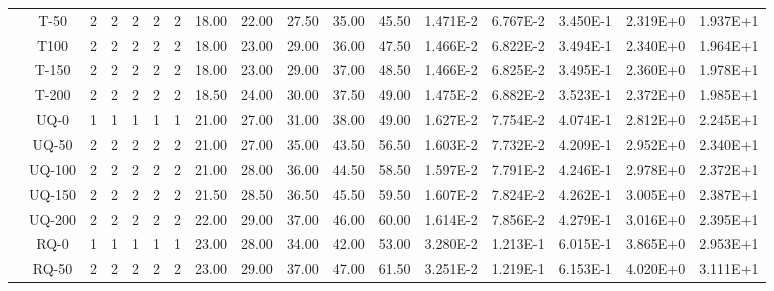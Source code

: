 \begin{table}[ht]
\begin{center}
{\begin{tabular}{cc|c|c|c|c|c|c|c|c|c|c|c|c|c|c|c|}
\multicolumn{1}{|c|}{}                      & \multicolumn{1}{|c|}{T-50} & 	2	&	2	&	2	&	2	&	2	&	18.00	&	22.00	&	27.50	&	35.00	&	45.50	&	1.471E-2	&	6.767E-2	&	3.450E-1	&	2.319E+0	&	1.937E+1	\\
\multicolumn{1}{|c|}{}                      & \multicolumn{1}{|c|}{T100} &	2	&	2	&	2	&	2	&	2	&	18.00	&	23.00	&	29.00	&	36.00	&	47.50	&	1.466E-2	&	6.822E-2	&	3.494E-1	&	2.340E+0	&	1.964E+1	\\
\multicolumn{1}{|c|}{}                      & \multicolumn{1}{|c|}{T-150} &	2	&	2	&	2	&	2	&	2	&	18.00	&	23.00	&	29.00	&	37.00	&	48.50	&	1.466E-2	&	6.825E-2	&	3.495E-1	&	2.360E+0	&	1.978E+1	\\
\multicolumn{1}{|c|}{}                      & \multicolumn{1}{|c|}{T-200} &	2	&	2	&	2	&	2	&	2	&	18.50	&	24.00	&	30.00	&	37.50	&	49.00	&	1.475E-2	&	6.882E-2	&	3.523E-1	&	2.372E+0	&	1.985E+1	\\
\cline{2-17}																														
\multicolumn{1}{|c|}{}                      & \multicolumn{1}{|c|}{UQ-0} &	1	&	1	&	1	&	1	&	1	&	21.00	&	27.00	&	31.00	&	38.00	&	49.00	&	1.627E-2	&	7.754E-2	&	4.074E-1	&	2.812E+0	&	2.245E+1	\\
\multicolumn{1}{|c|}{}                      & \multicolumn{1}{|c|}{UQ-50} &	2	&	2	&	2	&	2	&	2	&	21.00	&	27.00	&	35.00	&	43.50	&	56.50	&	1.603E-2	&	7.732E-2	&	4.209E-1	&	2.952E+0	&	2.340E+1	\\
\multicolumn{1}{|c|}{}                      & \multicolumn{1}{|c|}{UQ-100} &	2	&	2	&	2	&	2	&	2	&	21.00	&	28.00	&	36.00	&	44.50	&	58.50	&	1.597E-2	&	7.791E-2	&	4.246E-1	&	2.978E+0	&	2.372E+1	\\
\multicolumn{1}{|c|}{}                      & \multicolumn{1}{|c|}{UQ-150} &	2	&	2	&	2	&	2	&	2	&	21.50	&	28.50	&	36.50	&	45.50	&	59.50	&	1.607E-2	&	7.824E-2	&	4.262E-1	&	3.005E+0	&	2.387E+1	\\
\multicolumn{1}{|c|}{}                      & \multicolumn{1}{|c|}{UQ-200} &	2	&	2	&	2	&	2	&	2	&	22.00	&	29.00	&	37.00	&	46.00	&	60.00	&	1.614E-2	&	7.856E-2	&	4.279E-1	&	3.016E+0	&	2.395E+1	\\
\cline{2-17}																														
\multicolumn{1}{|c|}{}                      & \multicolumn{1}{|c|}{RQ-0} &	1	&	1	&	1	&	1	&	1	&	23.00	&	28.00	&	34.00	&	42.00	&	53.00	&	3.280E-2	&	1.213E-1	&	6.015E-1	&	3.865E+0	&	2.953E+1	\\
\multicolumn{1}{|c|}{}                      & \multicolumn{1}{|c|}{RQ-50} & 	2	&	2	&	2	&	2	&	2	&	23.00	&	29.00	&	37.00	&	47.00	&	61.50	&	3.251E-2	&	1.219E-1	&	6.153E-1	&	4.020E+0	&	3.111E+1	\\

\end{tabular}}
\end{center}
\end{table}
